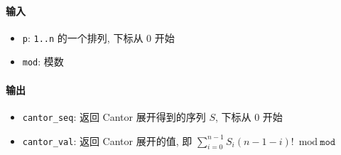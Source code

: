 \paragraph{输入}

\begin{itemize}
    \item \verb|p|: \verb|1..n| 的一个排列, 下标从 \(0\) 开始
    \item \verb|mod|: 模数
\end{itemize}

\paragraph{输出}

\begin{itemize}
    \item \verb|cantor_seq|: 返回 Cantor 展开得到的序列 \(S\), 下标从 \(0\) 开始
    \item \verb|cantor_val|: 返回 Cantor 展开的值, 即 \(\sum_{i=0}^{n-1}S_i(n-1-i)!\bmod \texttt{mod}\)
\end{itemize}
